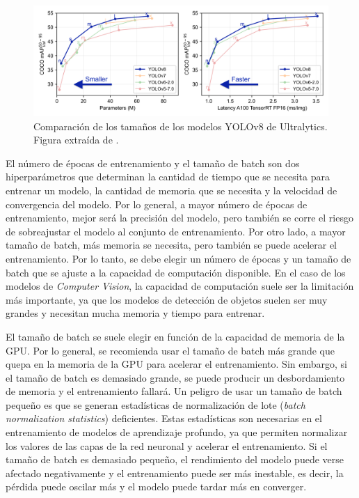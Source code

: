 \begin{figure}[H]
    \centering
    \includegraphics[width=1\textwidth]{graphs/yolo-comparison-plots.png}
    \caption{Comparación de los tamaños de los modelos YOLOv8 de Ultralytics. Figura extraída de \cite{ultralytics_yolov8_docs}.}
    \label{fig:yolo-comparison-plots}
\end{figure}

El número de épocas de entrenamiento y el tamaño de batch son dos hiperparámetros que determinan la cantidad de tiempo que se necesita para entrenar un modelo, la cantidad de memoria que se necesita y la velocidad de convergencia del modelo. Por lo general, a mayor número de épocas de entrenamiento, mejor será la precisión del modelo, pero también se corre el riesgo de sobreajustar el modelo al conjunto de entrenamiento. Por otro lado, a mayor tamaño de batch, más memoria se necesita, pero también se puede acelerar el entrenamiento. Por lo tanto, se debe elegir un número de épocas y un tamaño de batch que se ajuste a la capacidad de computación disponible. En el caso de los modelos de \textit{Computer Vision}, la capacidad de computación suele ser la limitación más importante, ya que los modelos de detección de objetos suelen ser muy grandes y necesitan mucha memoria y tiempo para entrenar.

El tamaño de batch se suele elegir en función de la capacidad de memoria de la GPU. Por lo general, se recomienda usar el tamaño de batch más grande que quepa en la memoria de la GPU para acelerar el entrenamiento. Sin embargo, si el tamaño de batch es demasiado grande, se puede producir un desbordamiento de memoria y el entrenamiento fallará. Un peligro de usar un tamaño de batch pequeño es que se generan estadísticas de normalización de lote (\textit{batch normalization statistics}) deficientes. Estas estadísticas son necesarias en el entrenamiento de modelos de aprendizaje profundo, ya que permiten normalizar los valores de las capas de la red neuronal y acelerar el entrenamiento. Si el tamaño de batch es demasiado pequeño, el rendimiento del modelo puede verse afectado negativamente y el entrenamiento puede ser más inestable, es decir, la pérdida puede oscilar más y el modelo puede tardar más en converger.

